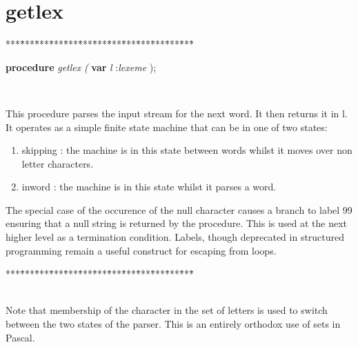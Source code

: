 \documentclass[10pt, a4paper]{article}
\begin{document}
\section{getlex}\label{sec:indexfiles/loadsetgetlex}

\begin{tabbing}
***\=***\=***\=***\=***\=***\=***\=***\=***\=***\=***\=***\=***\=\kill
\parbox{14cm}{\textsf{\textbf{procedure}  \textit{getlex} \textit{(} \textbf{var}  \textit{l} :\textit{lexeme} );}}\\
\end{tabbing}
This procedure parses the input stream for the next word.
It then returns it in l. It operates as a simple finite
state machine that can be in one of two states:
\begin{enumerate}
\item \textsf{skipping} : the machine is in this state between words
whilst it moves over non letter characters.
\item \textsf{inword} : the machine is in this state whilst it parses
a word.
\end{enumerate}
The special case of the occurence of the null character
causes a branch to label 99 ensuring that a null string
is returned by the procedure. This is used at the
next higher level as a termination condition.
Labels, though deprecated in structured programming remain
a useful construct for escaping from loops.
\begin{tabbing}
***\=***\=***\=***\=***\=***\=***\=***\=***\=***\=***\=***\=***\=\kill
\\
\\
\end{tabbing}
Note that membership of the character in the set of letters
is used to switch between the two states of the parser.
This is an entirely orthodox use of sets in Pascal.
\end{document}
